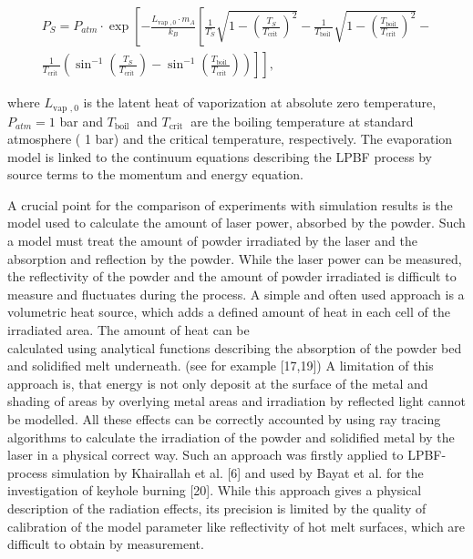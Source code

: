 \documentclass[10pt]{article}
\begin{document}
\begin{gather*}
P_{S}=P_{a t m} \cdot \exp \left[-\frac{L_{\text {vap }, 0} \cdot m_{A}}{k_{B}}\left[\frac{1}{T_{S}} \sqrt{1-\left(\frac{T_{S}}{T_{\text {crit }}}\right)^{2}}-\frac{1}{T_{\text {boil }}} \sqrt{1-\left(\frac{T_{\text {boil }}}{T_{\text {crit }}}\right)^{2}}-\right.\right.  \tag{1}\\
\left.\left.\frac{1}{T_{\text {crit }}}\left(\sin ^{-1}\left(\frac{T_{S}}{T_{\text {crit }}}\right)-\sin ^{-1}\left(\frac{T_{\text {boil }}}{T_{\text {crit }}}\right)\right)\right]\right],
\end{gather*}


where $L_{\text {vap }, 0}$ is the latent heat of vaporization at absolute zero temperature, $P_{a t m}=1$ bar and $T_{\text {boil }}$ and $T_{\text {crit }}$ are the boiling temperature at standard atmosphere ( 1 bar) and the critical temperature, respectively. The evaporation model is linked to the continuum equations describing the LPBF process by source terms to the momentum and energy equation.

A crucial point for the comparison of experiments with simulation results is the model used to calculate the amount of laser power, absorbed by the powder. Such a model must treat the amount of powder irradiated by the laser and the absorption and reflection by the powder. While the laser power can be measured, the reflectivity of the powder and the amount of powder irradiated is difficult to measure and fluctuates during the process. A simple and often used approach is a volumetric heat source, which adds a defined amount of heat in each cell of the irradiated area. The amount of heat can be\\
calculated using analytical functions describing the absorption of the powder bed and solidified melt underneath. (see for example [17,19]) A limitation of this approach is, that energy is not only deposit at the surface of the metal and shading of areas by overlying metal areas and irradiation by reflected light cannot be modelled. All these effects can be correctly accounted by using ray tracing algorithms to calculate the irradiation of the powder and solidified metal by the laser in a physical correct way. Such an approach was firstly applied to LPBF-process simulation by Khairallah et al. [6] and used by Bayat et al. for the investigation of keyhole burning [20]. While this approach gives a physical description of the radiation effects, its precision is limited by the quality of calibration of the model parameter like reflectivity of hot melt surfaces, which are difficult to obtain by measurement.
\end{document}
